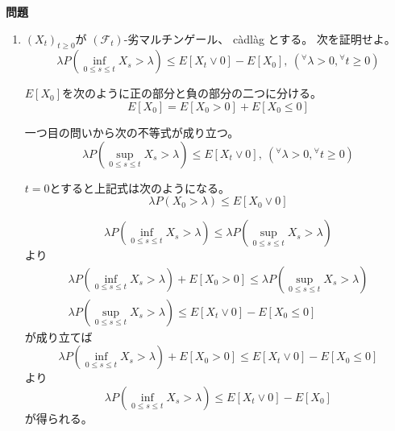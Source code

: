 \documentclass[12pt,b5paper]{ltjsarticle}
\begin{document}
\hrulefill

\textbf{問題}
\begin{enumerate}
 \item
      $(X_{t})_{t\geq0}$が
      $(\mathcal{F}_{t})$-劣マルチンゲール、
      c\`adl\`ag
      とする。
      次を証明せよ。
      \begin{equation}
       \lambda P\left( \inf_{0\leq s \leq t} X_{s} > \lambda \right)
        \leq E\left[ X_{t} \vee 0 \right] - E\left[ X_0 \right]
        ,\ ( {}^{\forall}\lambda >0, {}^{\forall}t \geq 0 )
      \end{equation}

      \dotfill

      $E[X_0]$を次のように正の部分と負の部分の二つに分ける。
      \begin{equation}
       E[X_0] = E[X_0>0] + E[X_0\leq 0]
      \end{equation}

      一つ目の問いから次の不等式が成り立つ。
      \begin{equation}
       \lambda P\left( \sup_{0\leq s \leq t} X_{s} > \lambda \right)
        \leq E\left[ X_{t} \lor 0 \right]
        ,\ ( {}^{\forall}\lambda >0, {}^{\forall}t \geq 0 )
      \end{equation}

      $t=0$とすると上記式は次のようになる。
      \begin{equation}
       \lambda P\left( X_{0} > \lambda \right)
        \leq E\left[ X_{0} \lor 0 \right]
      \end{equation}


      \begin{equation}
       \lambda P\left( \inf_{0\leq s \leq t} X_{s} > \lambda \right)
        \leq
       \lambda P\left( \sup_{0\leq s \leq t} X_{s} > \lambda \right)
      \end{equation}
      より
      \begin{gather}
       \lambda P\left( \inf_{0\leq s \leq t} X_{s} > \lambda \right)
        + E[X_0>0]
        \leq
       \lambda P\left( \sup_{0\leq s \leq t} X_{s} > \lambda \right)\\
       \lambda P\left( \sup_{0\leq s \leq t} X_{s} > \lambda \right)
       \leq
       E\left[ X_{t} \lor 0 \right] - E[X_0\leq 0]
      \end{gather}
      が成り立てば
      \begin{equation}
       \lambda P\left( \inf_{0\leq s \leq t} X_{s} > \lambda \right)
        + E[X_0>0]
        \leq
        E\left[ X_{t} \lor 0 \right] - E[X_0\leq 0]
      \end{equation}
      より
      \begin{equation}
       \lambda P\left( \inf_{0\leq s \leq t} X_{s} > \lambda \right)
        \leq E\left[ X_{t} \lor 0 \right] - E[X_0]
      \end{equation}
      が得られる。



\end{enumerate}
\end{document}

